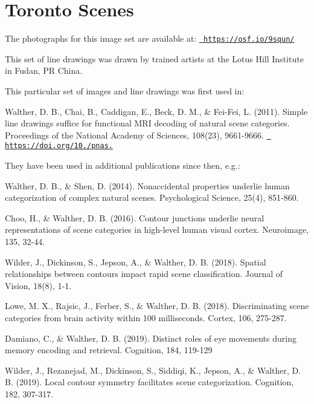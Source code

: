 \chapter{Toronto Scenes}
\hypertarget{md_data_sets_2_toronto_scenes_2_toronto_scenes___readme}{}\label{md_data_sets_2_toronto_scenes_2_toronto_scenes___readme}
\label{md_data_sets_2_toronto_scenes_2_toronto_scenes___readme_autotoc_md4}%
%
The photographs for this image set are available at\+: \href{https://osf.io/9squn/}{\texttt{ https\+://osf.\+io/9squn/}}

This set of line drawings was drawn by trained artists at the Lotus Hill Institute in Fudan, PR China.

This particular set of images and line drawings was first used in\+:

Walther, D. B., Chai, B., Caddigan, E., Beck, D. M., \& Fei-\/\+Fei, L. (2011). Simple line drawings suffice for functional MRI decoding of natural scene categories. Proceedings of the National Academy of Sciences, 108(23), 9661-\/9666. \href{https://doi.org/10.1073/pnas.101566610}{\texttt{ https\+://doi.\+org/10./pnas.}}

They have been used in additional publications since then, e.\+g.\+:

Walther, D. B., \& Shen, D. (2014). Nonaccidental properties underlie human categorization of complex natural scenes. Psychological Science, 25(4), 851-\/860.

Choo, H., \& Walther, D. B. (2016). Contour junctions underlie neural representations of scene categories in high-\/level human visual cortex. Neuroimage, 135, 32-\/44.

Wilder, J., Dickinson, S., Jepson, A., \& Walther, D. B. (2018). Spatial relationships between contours impact rapid scene classification. Journal of Vision, 18(8), 1-\/1.

Lowe, M. X., Rajsic, J., Ferber, S., \& Walther, D. B. (2018). Discriminating scene categories from brain activity within 100 milliseconds. Cortex, 106, 275-\/287.

Damiano, C., \& Walther, D. B. (2019). Distinct roles of eye movements during memory encoding and retrieval. Cognition, 184, 119-\/129

Wilder, J., Rezanejad, M., Dickinson, S., Siddiqi, K., Jepson, A., \& Walther, D. B. (2019). Local contour symmetry facilitates scene categorization. Cognition, 182, 307-\/317.


